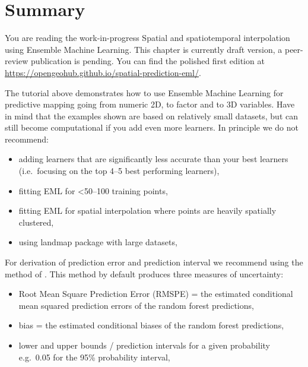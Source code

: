 \documentclass[
  graybox,natbib,nospthms]{svmono}
\providecommand{\tightlist}{%
  \setlength{\itemsep}{0pt}\setlength{\parskip}{0pt}}
\providecommand{\tightlist}{\setlength{\itemsep}{0pt}\setlength{\parskip}{0pt}}
\begin{document}
\hypertarget{summary}{%
\chapter{Summary}\label{summary}}

You are reading the work-in-progress Spatial and spatiotemporal interpolation using Ensemble Machine Learning. This chapter is currently draft version, a peer-review publication is pending. You can find the polished first edition at \url{https://opengeohub.github.io/spatial-prediction-eml/}.

The tutorial above demonstrates how to use Ensemble Machine Learning for predictive
mapping going from numeric 2D, to factor and to 3D variables. Have in mind that
the examples shown are based on relatively small datasets, but can still become
computational if you add even more learners. In principle we do not recommend:

\begin{itemize}
\tightlist
\item
  adding learners that are significantly less accurate than your best learners
  (i.e.~focusing on the top 4--5 best performing learners),\\
\item
  fitting EML for \textless50--100 training points,
\item
  fitting EML for spatial interpolation where points are heavily spatially clustered,
\item
  using landmap package with large datasets,
\end{itemize}

For derivation of prediction error and prediction interval we recommend using the
method of \citet{lu2021unified}. This method by default produces three measures of uncertainty:

\begin{itemize}
\tightlist
\item
  Root Mean Square Prediction Error (RMSPE) = the estimated conditional mean squared prediction errors of the random forest predictions,\\
\item
  bias = the estimated conditional biases of the random forest predictions,\\
\item
  lower and upper bounds / prediction intervals for a given probability e.g.~0.05 for the 95\% probability interval,
\end{itemize}
\end{document}
